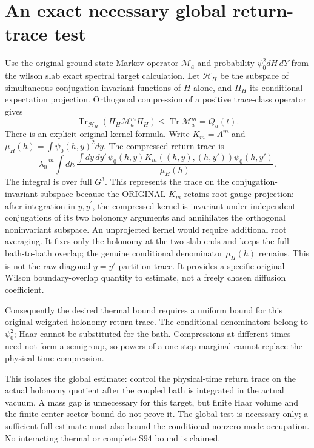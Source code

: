 \documentclass{article}
\begin{document}
\section*{An exact necessary global return-trace test}
Use the original ground-state Markov operator $\mathcal M_a$ and probability $\psi_0^2dH\,dY$ from the wilson slab exact spectral target calculation. Let $\mathcal H_H$ be the subspace of simultaneous-conjugation-invariant functions of $H$ alone, and $\Pi_H$ its conditional-expectation projection. Orthogonal compression of a positive trace-class operator gives
\[
 \operatorname{Tr}_{\mathcal H_H}(\Pi_H\mathcal M_a^m\Pi_H)
 \le\operatorname{Tr}\mathcal M_a^m=Q_a(t).
\]
There is an explicit original-kernel formula. Write $K_m=A^m$ and $\mu_H(h)=\int\psi_0(h,y)^2dy$. The compressed return trace is
\[
 \lambda_0^{-m}\int dh\,\frac{\int dy\,dy'\,
 \psi_0(h,y)K_m((h,y),(h,y'))\psi_0(h,y')}{\mu_H(h)}.
\]
The integral is over full $G^3$. This represents the trace on the conjugation-invariant subspace because the ORIGINAL $K_m$ retains root-gauge projection: after integration in $y,y^{\prime}$, the compressed kernel is invariant under independent conjugations of its two holonomy arguments and annihilates the orthogonal noninvariant subspace. An unprojected kernel would require additional root averaging. It fixes only the holonomy at the two slab ends and keeps the full bath-to-bath overlap; the genuine conditional denominator $\mu_H(h)$ remains. This is not the raw diagonal $y=y'$ partition trace. It provides a specific original-Wilson boundary-overlap quantity to estimate, not a freely chosen diffusion coefficient.

Consequently the desired thermal bound requires a uniform bound for this original weighted holonomy return trace. The conditional denominators belong to $\psi_0^2$; Haar cannot be substituted for the bath. Compressions at different times need not form a semigroup, so powers of a one-step marginal cannot replace the physical-time compression.

This isolates the global estimate: control the physical-time return trace on the actual holonomy quotient after the coupled bath is integrated in the actual vacuum. A mass gap is unnecessary for this target, but finite Haar volume and the finite center-sector bound do not prove it. The global test is necessary only; a sufficient full estimate must also bound the conditional nonzero-mode occupation. No interacting thermal or complete S94 bound is claimed.
\end{document}

